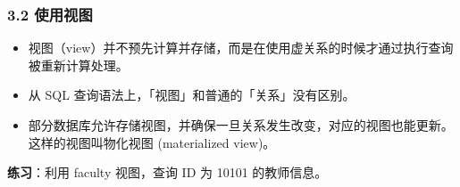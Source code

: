 \documentclass[aspectratio=169, 14pt]{beamer}
\begin{document}
\begin{frame}
    \frametitle{3.2 使用视图}
\begin{itemize}
    \item<1-> 视图（view）并不预先计算并存储，而是在使用虚关系的时候才通过执行查询被重新计算处理。
    \item<1-> 从 SQL 查询语法上，「视图」和普通的「关系」没有区别。
    \item<2-> 部分数据库允许存储视图，并确保一旦关系发生改变，对应的视图也能更新。这样的视图叫\alert{物化视图} (materialized view)。
\end{itemize}

\pause
{\large {}}  \textbf{练习}：利用 faculty 视图，查询 ID 为 10101 的教师信息。

\end{frame}
\end{document}
